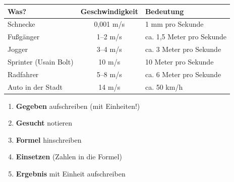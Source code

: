 \documentclass[11pt, a4paper]{article}
\begin{document}
\begin{center}
\renewcommand{\arraystretch}{1.3}
\begin{tabular}{|l|c|l|}
\hline
\textbf{Was?} & \textbf{Geschwindigkeit} & \textbf{Bedeutung} \\
\hline
Schnecke & 0,001 m/s & 1 mm pro Sekunde \\
\hline
Fußgänger & 1--2 m/s & ca. 1,5 Meter pro Sekunde \\
\hline
Jogger & 3--4 m/s & ca. 3 Meter pro Sekunde \\
\hline
Sprinter (Usain Bolt) & 10 m/s & 10 Meter pro Sekunde \\
\hline
Radfahrer & 5--8 m/s & ca. 6 Meter pro Sekunde \\
\hline
Auto in der Stadt & 14 m/s & ca. 50 km/h \\
\hline
\end{tabular}
\end{center}

\vspace{0.5em}

\begin{merkkasten}
\begin{enumerate}[leftmargin=1.5em, itemsep=2pt]
    \item \textbf{Gegeben} aufschreiben (mit Einheiten!)
    \item \textbf{Gesucht} notieren
    \item \textbf{Formel} hinschreiben
    \item \textbf{Einsetzen} (Zahlen in die Formel)
    \item \textbf{Ergebnis} mit Einheit aufschreiben
\end{enumerate}
\end{merkkasten}
\end{document}
